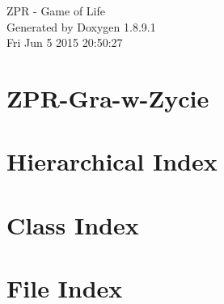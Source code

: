 \documentclass[twoside]{book}
\newcommand{\+}{\discretionary{\mbox{\scriptsize$\hookleftarrow$}}{}{}}
\newcommand{\clearemptydoublepage}{%
  \newpage{\pagestyle{empty}\cleardoublepage}%
}
\begin{document}
\hypersetup{pageanchor=false,
             bookmarks=true,
             bookmarksnumbered=true,
             pdfencoding=unicode
            }
\begin{titlepage}
\vspace*{7cm}
\begin{center}%
{\Large Z\+P\+R -\/ Game of Life }\\
\vspace*{1cm}
{\large Generated by Doxygen 1.8.9.1}\\
\vspace*{0.5cm}
{\small Fri Jun 5 2015 20:50:27}\\
\end{center}
\end{titlepage}
\clearemptydoublepage
\tableofcontents
\clearemptydoublepage
{}
\hypersetup{pageanchor=true}

\chapter{Z\+P\+R-\/\+Gra-\/w-\/\+Zycie}
\label{md__r_e_a_d_m_e}
\hypertarget{md__r_e_a_d_m_e}{}

\chapter{Hierarchical Index}

\chapter{Class Index}

\chapter{File Index}

\end{document}
